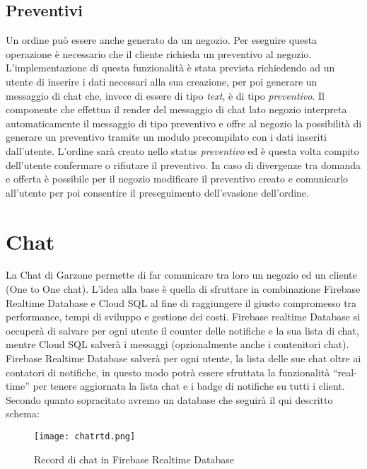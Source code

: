 \subsection{Preventivi}
Un ordine può essere anche generato da un negozio. Per eseguire questa operazione è necessario che il cliente richieda un preventivo al negozio. L'implementazione di questa funzionalità è stata prevista richiedendo ad un utente di inserire i dati necessari alla sua creazione, per poi generare un messaggio di chat che, invece di essere di tipo \textit{text}, è di tipo \textit{preventivo}. Il componente che effettua il render del messaggio di chat lato negozio interpreta automaticamente il messaggio di tipo preventivo e offre al negozio la possibilità di generare un preventivo tramite un modulo precompilato con i dati inseriti dall'utente. L'ordine sarà creato nello status \textit{preventivo} ed è questa volta compito dell'utente confermare o rifiutare il preventivo. In caso di divergenze tra domanda e offerta è possibile per il negozio modificare il preventivo creato e comunicarlo all'utente per poi consentire il preseguimento dell'evasione dell'ordine.
\section{Chat}
La Chat di Garzone permette di far comunicare tra loro un negozio ed un  cliente (One to One chat). L’idea alla base è quella di sfruttare in combinazione Firebase Realtime Database e Cloud SQL al fine di raggiungere il giusto compromesso tra performance, tempi di sviluppo e gestione dei costi. Firebase realtime Database si occuperà di salvare per ogni utente il counter delle notifiche e la sua lista di chat, mentre Cloud SQL salverà i messaggi (opzionalmente anche i contenitori chat). Firebase Realtime Database salverà per ogni utente, la lista delle sue chat oltre ai contatori di notifiche, in questo modo potrà essere sfruttata la funzionalità “real-time” per tenere aggiornata la lista chat e i badge di notifiche su tutti i client.\\
Secondo quanto sopracitato avremo un database che seguirà il qui descritto schema:
\begin{figure}[h!]
    \centering
    \texttt{[image: chatrtd.png]}
    \caption{Record di chat in Firebase Realtime Database}
\end{figure}
\FloatBarrier

